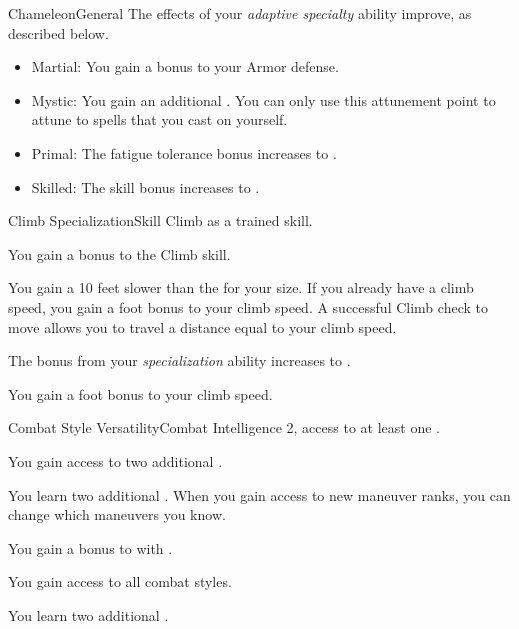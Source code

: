 \begin{feat}{Chameleon}{General}
         The effects of your \textit{adaptive specialty} ability improve, as described below.
        \begin{itemize}
            \item Martial: You gain a  bonus to your Armor defense.
            \item Mystic: You gain an additional .
                You can only use this attunement point to attune to spells that you cast on yourself.
            \item Primal: The fatigue tolerance bonus increases to .
            \item Skilled: The skill bonus increases to .
        \end{itemize}
    \end{feat}

    \begin{feat}{Climb Specialization}{Skill}
        \featpre Climb as a trained skill.

         You gain a  bonus to the Climb skill.

         You gain a  10 feet slower than the  for your size.
        If you already have a climb speed, you gain a  foot bonus to your climb speed.
        A successful Climb check to move allows you to travel a distance equal to your climb speed.

         The bonus from your \textit{specialization} ability increases to .

         You gain a  foot bonus to your climb speed.
    \end{feat}

    \begin{feat}{Combat Style Versatility}{Combat}
        \featpre Intelligence 2, access to at least one .

         You gain access to two additional .

         You learn two additional .
        When you gain access to new maneuver ranks, you can change which maneuvers you know.

         You gain a  bonus to  with .

         You gain access to all combat styles.

         You learn two additional .
    \end{feat}

